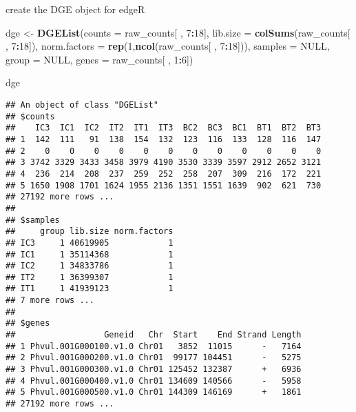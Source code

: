 \documentclass[
]{article}
\newenvironment{Shaded}{\begin{snugshade}}{\end{snugshade}}
\newcommand{\DataTypeTok}[1]{\textcolor[rgb]{0.13,0.29,0.53}{#1}}
\newcommand{\DecValTok}[1]{\textcolor[rgb]{0.00,0.00,0.81}{#1}}
\newcommand{\KeywordTok}[1]{\textcolor[rgb]{0.13,0.29,0.53}{\textbf{#1}}}
\newcommand{\NormalTok}[1]{#1}
\newcommand{\OperatorTok}[1]{\textcolor[rgb]{0.81,0.36,0.00}{\textbf{#1}}}
\newcommand{\OtherTok}[1]{\textcolor[rgb]{0.56,0.35,0.01}{#1}}
\newcommand{\StringTok}[1]{\textcolor[rgb]{0.31,0.60,0.02}{#1}}
\begin{document}
create the DGE object for edgeR

\begin{Shaded}
\begin{Highlighting}[]
\NormalTok{dge <-}\StringTok{ }\KeywordTok{DGEList}\NormalTok{(}\DataTypeTok{counts =}\NormalTok{ raw_counts[ , }\DecValTok{7}\OperatorTok{:}\DecValTok{18}\NormalTok{],}
               \DataTypeTok{lib.size =} \KeywordTok{colSums}\NormalTok{(raw_counts[ , }\DecValTok{7}\OperatorTok{:}\DecValTok{18}\NormalTok{]),}
               \DataTypeTok{norm.factors =} \KeywordTok{rep}\NormalTok{(}\DecValTok{1}\NormalTok{,}\KeywordTok{ncol}\NormalTok{(raw_counts[ , }\DecValTok{7}\OperatorTok{:}\DecValTok{18}\NormalTok{])),}
               \DataTypeTok{samples =} \OtherTok{NULL}\NormalTok{,}
               \DataTypeTok{group =} \OtherTok{NULL}\NormalTok{,}
               \DataTypeTok{genes =}\NormalTok{ raw_counts[ , }\DecValTok{1}\OperatorTok{:}\DecValTok{6}\NormalTok{])}


\NormalTok{dge}
\end{Highlighting}
\end{Shaded}

\begin{verbatim}
## An object of class "DGEList"
## $counts
##    IC3  IC1  IC2  IT2  IT1  IT3  BC2  BC3  BC1  BT1  BT2  BT3
## 1  142  111   91  138  154  132  123  116  133  128  116  147
## 2    0    0    0    0    0    0    0    0    0    0    0    0
## 3 3742 3329 3433 3458 3979 4190 3530 3339 3597 2912 2652 3121
## 4  236  214  208  237  259  252  258  207  309  216  172  221
## 5 1650 1908 1701 1624 1955 2136 1351 1551 1639  902  621  730
## 27192 more rows ...
## 
## $samples
##     group lib.size norm.factors
## IC3     1 40619905            1
## IC1     1 35114368            1
## IC2     1 34833786            1
## IT2     1 36399307            1
## IT1     1 41939123            1
## 7 more rows ...
## 
## $genes
##                  Geneid   Chr  Start    End Strand Length
## 1 Phvul.001G000100.v1.0 Chr01   3852  11015      -   7164
## 2 Phvul.001G000200.v1.0 Chr01  99177 104451      -   5275
## 3 Phvul.001G000300.v1.0 Chr01 125452 132387      +   6936
## 4 Phvul.001G000400.v1.0 Chr01 134609 140566      -   5958
## 5 Phvul.001G000500.v1.0 Chr01 144309 146169      +   1861
## 27192 more rows ...
\end{verbatim}

\begin{Shaded}
\end{Shaded}
\end{document}
